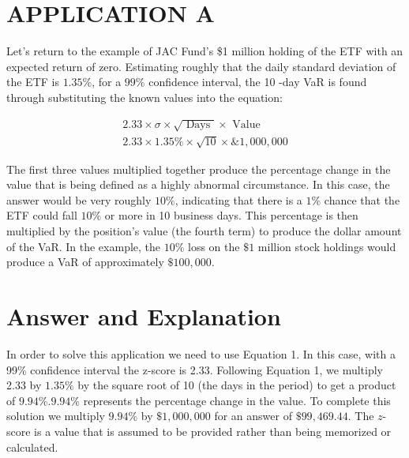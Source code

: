 \documentclass[11pt]{article}
\begin{document}
\section*{APPLICATION A}
Let's return to the example of JAC Fund's \$1 million holding of the ETF with an expected return of zero. Estimating roughly that the daily standard deviation of the ETF is $1.35 \%$, for a $99 \%$ confidence interval, the 10 -day VaR is found through substituting the known values into the equation:

$$
\begin{gathered}
2.33 \times \sigma \times \sqrt{\text { Days }} \times \text { Value } \\
2.33 \times 1.35 \% \times \sqrt{10} \times \& 1,000,000
\end{gathered}
$$

The first three values multiplied together produce the percentage change in the value that is being defined as a highly abnormal circumstance. In this case, the answer would be very roughly $10 \%$, indicating that there is a $1 \%$ chance that the ETF could fall $10 \%$ or more in 10 business days. This percentage is then multiplied by the position's value (the fourth term) to produce the dollar amount of the VaR. In the example, the $10 \%$ loss on the $\$ 1$ million stock holdings would produce a VaR of approximately $\$ 100,000$.

\section*{Answer and Explanation}
In order to solve this application we need to use Equation 1. In this case, with a 99\% confidence interval the z-score is 2.33. Following Equation 1, we multiply 2.33 by $1.35 \%$ by the square root of 10 (the days in the period) to get a product of $9.94 \% .9 .94 \%$ represents the percentage change in the value. To complete this solution we multiply $9.94 \%$ by $\$ 1,000,000$ for an answer of $\$ 99,469.44$. The $z$-score is a value that is assumed to be provided rather than being memorized or calculated.
\end{document}

